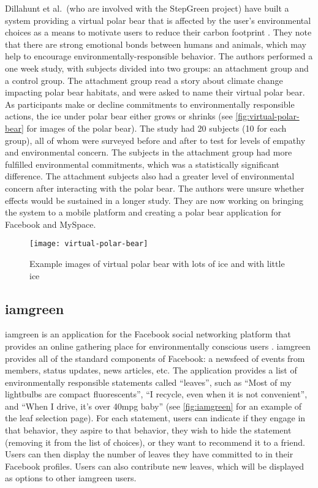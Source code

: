 Dillahunt et al.\ (who are involved with the StepGreen project) have built a system providing a virtual polar bear that is affected by the user's environmental choices as a means to motivate users to reduce their carbon footprint \cite{dillahunt-virtual-polar-bear-2008}. They note that there are strong emotional bonds between humans and animals, which may help to encourage environmentally-responsible behavior. The authors performed a one week study, with subjects divided into two groups: an attachment group and a control group. The attachment group read a story about climate change impacting polar bear habitats, and were asked to name their virtual polar bear. As participants make or decline commitments to environmentally responsible actions, the ice under polar bear either grows or shrinks (see \autoref{fig:virtual-polar-bear} for images of the polar bear). The study had 20 subjects (10 for each group), all of whom were surveyed before and after to test for levels of empathy and environmental concern. The subjects in the attachment group had more fulfilled environmental commitments, which was a statistically significant difference. The attachment subjects also had a greater level of environmental concern after interacting with the polar bear. The authors were unsure whether effects would be sustained in a longer study. They are now working on bringing the system to a mobile platform and creating a polar bear application for Facebook and MySpace.

\begin{figure}[htbp]
	\centering
		\texttt{[image: virtual-polar-bear]}
		\caption{Example images of virtual polar bear with lots of ice and with little ice}
		\label{fig:virtual-polar-bear}
\end{figure}

\subsection{iamgreen}
\label{sec:iamgreen}

iamgreen is an application for the Facebook social networking platform that provides an online gathering place for environmentally conscious users \cite{iamgreen-website}. iamgreen provides all of the standard components of Facebook: a newsfeed of events from members, status updates, news articles, etc. The application provides a list of environmentally responsible statements called ``leaves'', such as ``Most of my lightbulbs are compact fluorescents'', ``I recycle, even when it is not convenient'', and ``When I drive, it's over 40mpg baby'' (see \autoref{fig:iamgreen} for an example of the leaf selection page). For each statement, users can indicate if they engage in that behavior, they aspire to that behavior, they wish to hide the statement (removing it from the list of choices), or they want to recommend it to a friend. Users can then display the number of leaves they have committed to in their Facebook profiles. Users can also contribute new leaves, which will be displayed as options to other iamgreen users.

